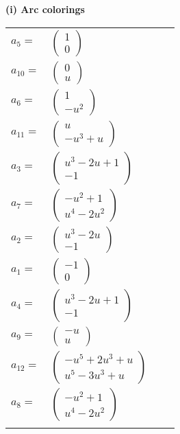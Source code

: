 \documentclass[1p]{elsarticle_modified}
\theoremstyle{definition}
\begin{document}
\flushleft \textbf{(i) Arc colorings}\\
\begin{tabular}{m{7pt} m{180pt} m{7pt} m{180pt} }
\flushright $a_{5}=$&$\begin{pmatrix}1\\0\end{pmatrix}$ \\
\flushright $a_{10}=$&$\begin{pmatrix}0\\u\end{pmatrix}$ \\
\flushright $a_{6}=$&$\begin{pmatrix}1\\- u^2\end{pmatrix}$ \\
\flushright $a_{11}=$&$\begin{pmatrix}u\\- u^3+u\end{pmatrix}$ \\
\flushright $a_{3}=$&$\begin{pmatrix}u^3-2 u+1\\-1\end{pmatrix}$ \\
\flushright $a_{7}=$&$\begin{pmatrix}- u^2+1\\u^4-2 u^2\end{pmatrix}$ \\
\flushright $a_{2}=$&$\begin{pmatrix}u^3-2 u\\-1\end{pmatrix}$ \\
\flushright $a_{1}=$&$\begin{pmatrix}-1\\0\end{pmatrix}$ \\
\flushright $a_{4}=$&$\begin{pmatrix}u^3-2 u+1\\-1\end{pmatrix}$ \\
\flushright $a_{9}=$&$\begin{pmatrix}- u\\u\end{pmatrix}$ \\
\flushright $a_{12}=$&$\begin{pmatrix}- u^5+2 u^3+u\\u^5-3 u^3+u\end{pmatrix}$ \\
\flushright $a_{8}=$&$\begin{pmatrix}- u^2+1\\u^4-2 u^2\end{pmatrix}$\\&\end{tabular}
\end{document}

